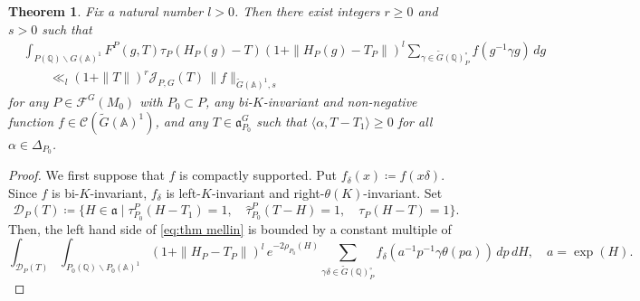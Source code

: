 \documentclass[12pt]{amsart}
\theoremstyle{definition}
\theoremstyle{plain}
\newtheorem{theorem}[definition]{Theorem}
\theoremstyle{remark}
\def\Q{\mathbb{Q}}%
\def\A{\mathbb{A}}%
\newcommand{\fa}{\mathfrak{a}}
\newcommand{\cC}{\mathcal{C}}
\newcommand{\cD}{\mathcal{D}}
\newcommand{\cF}{\mathcal{F}}
\newcommand{\cJ}{\mathcal{J}}
\numberwithin{equation}{section}
\newcommand{\tG}{\widetilde{G}}
\begin{document}
\begin{theorem}\label{thm:bound 1} 
    Fix a natural number $l>0$. 
    Then there exist integers $r\geq0$ and $s>0$ such that
\begin{align}\label{eq:thm mellin}
 &\int_{P(\mathbb Q)\backslash G(\mathbb A)^1}
 F^P(g,T)\tau_P(H_P(g)-T)
 (1+\|H_P(g)-T_P\|)^l
 \sum_{\gamma\in \tG(\Q)^\circ_{P}}
 f(g^{-1}\gamma g) \, dg \\
 &\qquad\ll_l
 (1+\|T\|)^r \cJ_{P,G}(T) \, \| f\|_{\tG(\A)^1,s}  \nonumber
\end{align}
for any $P\in\cF^G(M_0)$ with $P_0\subset P$, any bi-$K$-invariant and non-negative function $f\in \cC(\tG(\A)^1)$, and any $T\in\mathfrak a_{P_0}^G$ such that $\langle\alpha,T-T_1\rangle\geq0$ for all $\alpha\in\Delta_{P_0}$.
\end{theorem}
\begin{proof}
We first suppose that $f$ is compactly supported. 
Put $f_\delta(x)\coloneqq f(x\delta)$.
Since $f$ is bi-$K$-invariant, $f_\delta$ is left-$K$-invariant and right-$\theta(K)$-invariant. 
Set
\[
\cD_P(T)\coloneqq \{H\in\fa\mid 
\tau_{P_0}^{P}(H-T_1)=1,\quad
\widehat\tau_{P_0}^{P}(T-H)=1, \quad \tau_P(H-T)=1\}.
\]
Then, the left hand side of \eqref{eq:thm mellin} is bounded by a constant multiple of 
\begin{equation}\label{eq:r1}
\int_{\cD_P(T)}\int_{P_0(\Q)\backslash P_0(\A)^1}
 (1+\|H_P-T_P\|)^l \, e^{-2\rho_{P_0}(H)}
 \sum_{\gamma\delta\in \tG(\Q)^\circ_{P}}
 f_\delta(a^{-1}p^{-1}\gamma \theta(pa)) \, dp\, dH, \quad a=\exp(H).
\end{equation} 



\end{proof}
\end{document}
